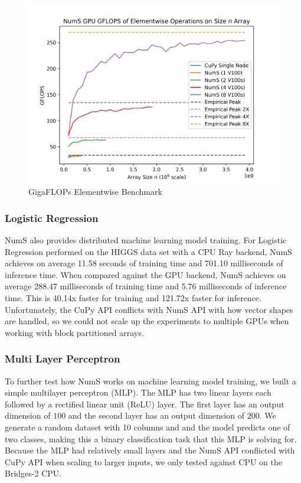 \documentclass{article}
\begin{document}
\begin{figure}
  \centerline{\includegraphics[width=5in]{figures/NumS_GPU_GFLOPS_elementwise.png}}
  \caption{GigaFLOPs Elementwise Benchmark}
  \label{fig:elementwise}
\end{figure}

\subsubsection{Logistic Regression}
NumS also provides distributed machine learning model training. For Logistic Regression performed on the HIGGS data set with a CPU Ray backend, NumS achieves on average 11.58 seconds of training time and 701.10 milliseconds of inference time. When compared against the GPU backend, NumS achieves on average 288.47 milliseconds of training time and 5.76 milliseconds of inference time. This is 40.14x faster for training and 121.72x faster for inference. Unfortunately, the CuPy API conflicts with NumS API with how vector shapes are handled, so we could not scale up the experiments to multiple GPUs when working with block partitioned arrays. 

\subsubsection{Multi Layer Perceptron}
To further test how NumS works on machine learning model training, we built a simple multilayer perceptron (MLP). The MLP has two linear layers each followed by a rectified linear unit (ReLU) layer. The first layer has an output dimension of $100$ and the second layer has an output dimension of $200$. We generate a random dataset with 10 columns and and the model predicts one of two classes, making this a binary classification task that this MLP is solving for. Because the MLP had relatively small layers and the NumS API conflicted with CuPy API when scaling to larger inputs, we only tested against CPU on the Bridges-2 CPU. 
\end{document}
